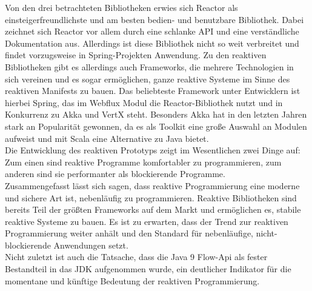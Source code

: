 Von den drei betrachteten Bibliotheken erwies sich Reactor als einsteigerfreundlichste und am besten bedien- und benutzbare Bibliothek. Dabei zeichnet sich Reactor vor allem durch eine schlanke API und eine verständliche Dokumentation aus. Allerdings ist diese Bibliothek nicht so weit verbreitet und findet vorzugsweise in Spring-Projekten Anwendung. Zu den reaktiven Bibliotheken gibt es allerdings auch Frameworks, die mehrere Technologien in sich vereinen und es sogar ermöglichen, ganze reaktive Systeme im Sinne des reaktiven Manifests zu bauen. Das beliebteste Framework unter Entwicklern ist hierbei Spring, das im Webflux Modul die Reactor-Bibliothek nutzt und in Konkurrenz zu Akka und VertX steht. Besonders Akka hat in den letzten Jahren stark an Popularität gewonnen, da es als Toolkit eine große Auswahl an Modulen aufweist und mit Scala eine Alternative zu Java bietet. \\

Die Entwicklung des reaktiven Prototyps zeigt im Wesentlichen zwei Dinge auf: Zum einen sind reaktive Programme komfortabler zu programmieren, zum anderen sind sie performanter als blockierende Programme. \\

Zusammengefasst lässt sich sagen, dass reaktive Programmierung eine moderne und sichere Art ist, nebenläufig zu programmieren. Reaktive Bibliotheken sind bereits Teil der größten Frameworks auf dem Markt und ermöglichen es, stabile reaktive Systeme zu bauen. Es ist zu erwarten, dass der Trend zur reaktiven Programmierung weiter anhält und den Standard für nebenläufige, nicht-blockierende Anwendungen setzt. \\

 Nicht zuletzt ist auch die Tatsache, dass die Java 9 Flow-Api als fester Bestandteil in das JDK aufgenommen wurde, ein deutlicher Indikator für die momentane und künftige Bedeutung der reaktiven Programmierung. 
